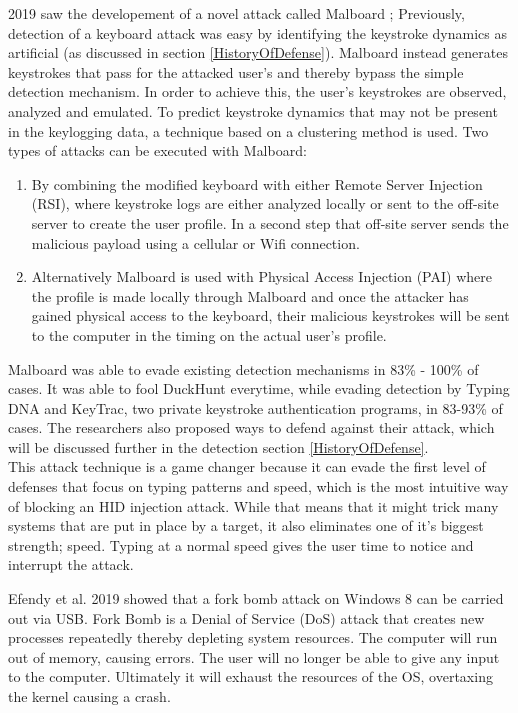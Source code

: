 \label{malboard}2019 saw the developement of a novel attack called Malboard \cite{farhiMalboardNovelUser2019}; Previously, detection of a keyboard attack was easy by identifying the keystroke dynamics as artificial (as discussed in section \ref{HistoryOfDefense}). Malboard instead generates keystrokes that pass for the attacked user's and thereby bypass the simple detection mechanism. In order to achieve this, the user's keystrokes are observed, analyzed and emulated. To predict keystroke dynamics that may not be present in the keylogging data, a technique based on a clustering method is used. Two types of attacks can be executed with Malboard: 
\begin{enumerate}
    \item By combining the modified keyboard with either Remote Server Injection (RSI), where keystroke logs are either analyzed locally or sent to the off-site server to create the user profile. In a second step that off-site server sends the malicious payload using a cellular or Wifi connection. 
    \item Alternatively Malboard is used with Physical Access Injection (PAI) where the profile is made locally through Malboard and once the attacker has gained physical access to the keyboard, their malicious keystrokes will be sent to the computer in the timing on the actual user's profile. 
 \end{enumerate}
 Malboard was able to evade existing detection mechanisms in 83\% - 100\% of cases. It was able to fool DuckHunt everytime, while evading detection by Typing DNA and KeyTrac, two private keystroke authentication programs, in 83-93\% of cases. The researchers also proposed ways to defend against their attack, which will be discussed further in the detection section \ref{HistoryOfDefense}. \\
 This attack technique is a game changer because it can evade the first level of defenses that focus on typing patterns and speed, which is the most intuitive way of blocking an HID injection attack. While that means that it might trick many systems that are put in place by a target, it also eliminates one of it's biggest strength; speed. Typing at a normal speed gives the user time to notice and interrupt the attack.  


Efendy et al. 2019 \cite{efendyExploringPossibilityUSB2019} showed that a fork bomb attack on Windows 8 can be carried out via USB. Fork Bomb is a Denial of Service (DoS) attack that creates new processes repeatedly thereby depleting system resources. The computer will run out of memory, causing errors. The user will no longer be able to give any input to the computer. Ultimately it will exhaust the resources of the OS, overtaxing the kernel causing a crash.  

